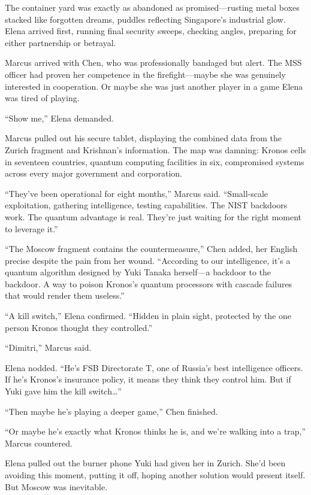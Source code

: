 \documentclass[12pt,letterpaper]{book}
\begin{document}
The container yard was exactly as abandoned as promised---rusting metal boxes stacked like forgotten dreams, puddles reflecting Singapore's industrial glow. Elena arrived first, running final security sweeps, checking angles, preparing for either partnership or betrayal.

Marcus arrived with Chen, who was professionally bandaged but alert. The MSS officer had proven her competence in the firefight---maybe she was genuinely interested in cooperation. Or maybe she was just another player in a game Elena was tired of playing.

``Show me,'' Elena demanded.

Marcus pulled out his secure tablet, displaying the combined data from the Zurich fragment and Krishnan's information. The map was damning: Kronos cells in seventeen countries, quantum computing facilities in six, compromised systems across every major government and corporation.

``They've been operational for eight months,'' Marcus said. ``Small-scale exploitation, gathering intelligence, testing capabilities. The NIST backdoors work. The quantum advantage is real. They're just waiting for the right moment to leverage it.''

``The Moscow fragment contains the countermeasure,'' Chen added, her English precise despite the pain from her wound. ``According to our intelligence, it's a quantum algorithm designed by Yuki Tanaka herself---a backdoor to the backdoor. A way to poison Kronos's quantum processors with cascade failures that would render them useless.''

``A kill switch,'' Elena confirmed. ``Hidden in plain sight, protected by the one person Kronos thought they controlled.''

``Dimitri,'' Marcus said.

Elena nodded. ``He's FSB Directorate T, one of Russia's best intelligence officers. If he's Kronos's insurance policy, it means they think they control him. But if Yuki gave him the kill switch\ldots{}''

``Then maybe he's playing a deeper game,'' Chen finished.

``Or maybe he's exactly what Kronos thinks he is, and we're walking into a trap,'' Marcus countered.

Elena pulled out the burner phone Yuki had given her in Zurich. She'd been avoiding this moment, putting it off, hoping another solution would present itself. But Moscow was inevitable.
\end{document}
